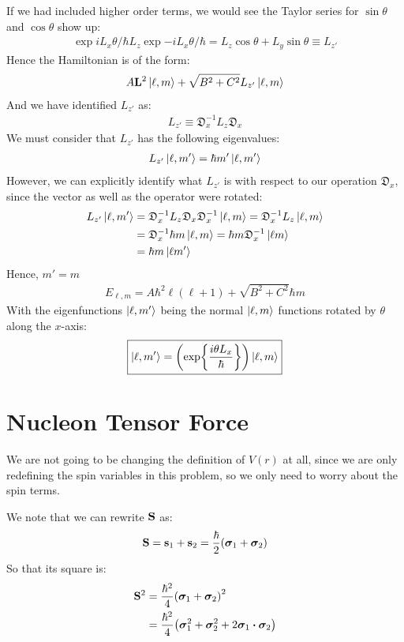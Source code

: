 \documentclass[12pt]{article}
\renewcommand{\l}{\ell}
\begin{document}
If we had included higher order terms, we would see the Taylor series for $\sin\theta$ and $\cos\theta$ show up:
\begin{align*}
  \exp{iL_x\theta/\hbar} L_z \exp{-iL_x\theta/\hbar}=
  L_z\cos\theta+L_y\sin\theta\equiv L_{z'}
\end{align*}
Hence the Hamiltonian is of the form:
\begin{align*}
  A\vb{L}^2\ket{\l,m}+\sqrt{B^2+C^2}L_{z'}\ket{\l,m}
\end{align*}
And we have identified $L_{z'}$ as:
\begin{align*}
  L_{z'}\equiv\mathfrak{D}_x^{-1}L_z\mathfrak{D}_x
\end{align*}
We must consider that $L_{z'}$ has the following eigenvalues:
\begin{align*}
  L_{z'}\ket{\l,m'}=\hbar m'\ket{\l,m'}
\end{align*}
However, we can explicitly identify what $L_{z'}$ is with respect to our operation $\mathfrak{D}_x$, since the vector as well as the operator were rotated:
\begin{align*}
  L_{z'}\ket{\l,m'}&=\mathfrak{D}_x^{-1}L_{z}\mathfrak{D}_x
  \mathfrak{D}_x^{-1}\ket{\l,m}=\mathfrak{D}_x^{-1}L_{z}\ket{\l,m}\\
  &=\mathfrak{D}_x^{-1}\hbar m\ket{\l,m}=\hbar m\mathfrak{D}_x^{-1}\ket{\l m}\\
  &=\hbar m\ket{\l m'}
\end{align*}
Hence, $m'=m$
\begin{align}
  \boxed{E_{\l,m}=A\hbar^2\l(\l+1)+\sqrt{B^2+C^2}\hbar m}
\end{align}
With the eigenfunctions $\ket{\l,m'}$ being the normal $\ket{\l,m}$ functions rotated by $\theta$ along the $x$-axis:
\begin{align}
  \boxed{\ket{\l,m'}=\qty(\exp{\frac{i\theta L_x}{\hbar}})\ket{\l,m}}
\end{align}

\section{Nucleon Tensor Force}
We are not going to be changing the definition of $V(r)$ at all, since we are only redefining the spin variables in this problem, so we only need to worry about the spin terms.

We note that we can rewrite $\vb{S}$ as:
\begin{align*}
  \vb{S}=\vb{s}_1+\vb{s}_2=\frac{\hbar}{2}\qty(\bm\sigma_1+\bm\sigma_2)
\end{align*}
So that its square is:
\begin{align*}
  \vb{S}^2&=\frac{\hbar^2}{4}\qty(\bm\sigma_1+\bm\sigma_2)^2\\
  &=\frac{\hbar^2}{4}
  \qty(\bm\sigma_1^2+\bm\sigma_2^2+2\bm\sigma_1\vdot\bm\sigma_2)
\end{align*}
\end{document}
